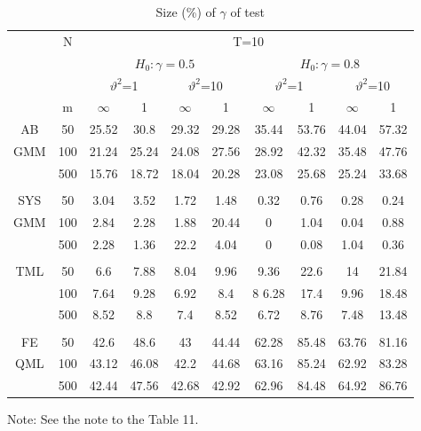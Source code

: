 \documentclass[12pt,a4paper,hyperref]{article}
\begin{document}
\begin{center}
\begin{table}[H]
\caption{Size (\%) of $\gamma$ of test} \label{table12}
\centering
\begin{tabular} {*{10}{c}}
\toprule
&N& \multicolumn{8}{c}{T=10}\\
\cmidrule(lr){3-10}
&& \multicolumn{4}{c}{$H_{0}: \gamma=0.5$} & \multicolumn{4}{c}{$H_{0}: \gamma=0.8$}\\
  \cmidrule(lr){3-6} \cmidrule(lr){7-10}
&&  \multicolumn{2}{c}{$\vartheta^{2}$=1}&\multicolumn{2}{c}{$\vartheta^{2}$=10} & \multicolumn{2}{c}{$\vartheta^{2}$=1}&\multicolumn{2}{c}{$\vartheta^{2}$=10}\\
\cmidrule(lr){3-4} \cmidrule(lr){5-6}\cmidrule(lr){7-8}\cmidrule(lr){9-10}
& m & $\infty$ &1&$\infty$ &1&$\infty$ &1&$\infty$&1\\
\cmidrule(lr){3-4} \cmidrule(lr){5-6}\cmidrule(lr){7-8}\cmidrule(lr){9-10}
AB&50 &25.52&	30.8	&29.32&	29.28	&35.44	&53.76	&44.04	&57.32\\
GMM&100&21.24	&25.24&	24.08&	27.56	&28.92	&42.32	&35.48&	47.76\\ 
 &500& 15.76&	18.72	&18.04&	20.28	&23.08	&25.68&	25.24	&33.68 \\
\midrule \\
\cmidrule(lr){3-4} \cmidrule(lr){5-6}\cmidrule(lr){7-8}\cmidrule(lr){9-10}
SYS&50 &3.04&	3.52&	1.72	&1.48&	0.32&	0.76	&0.28&	0.24\\
 GMM&100& 2.84&	2.28	&1.88&	20.44	&0	&1.04&	0.04	&0.88\\  
 &500 &2.28&1.36	&22.2	&4.04	&0&	0.08&	1.04	&0.36\\
\midrule \\
\cmidrule(lr){3-4} \cmidrule(lr){5-6}\cmidrule(lr){7-8}\cmidrule(lr){9-10}
TML &50 	&6.6&	7.88	&8.04	&9.96	&9.36&	22.6	&14	&21.84\\
&100&7.64	&9.28&	6.92	&8.4&8	6.28&	17.4	&9.96&	18.48\\
 &500 & 8.52	&8.8&	7.4	&8.52	&6.72	&8.76&	7.48	&13.48\\
 \midrule \\
\cmidrule(lr){3-4} \cmidrule(lr){5-6}\cmidrule(lr){7-8}\cmidrule(lr){9-10}
FE& 50 &42.6&	48.6&43	&44.44&62.28&85.48&	63.76&	81.16
\\
 QML&100 &43.12	&46.08&42.2&44.68&63.16	&85.24	&62.92&	83.28
 \\ 
 &500 &42.44&47.56&42.68&42.92	&62.96&	84.48&	64.92	&86.76
\\ 
\bottomrule
\end{tabular}
\begin{tablenotes}
      \small
      \item Note: See the note to the Table 11.
    \end{tablenotes}
\end{table}
\end{center}
\end{document}
